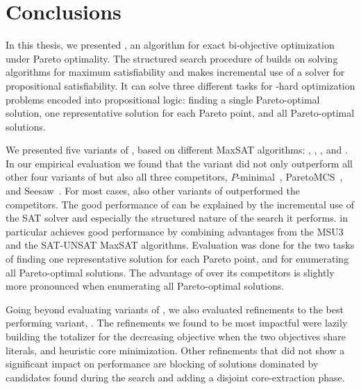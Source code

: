 \chapter{Conclusions\label{chap:conclusion}}

In this thesis, we presented \algname{}, an algorithm for exact bi-objective optimization under Pareto optimality.
The structured search procedure of \algname{} builds on solving algorithms for maximum satisfiability and makes incremental use of a solver for propositional satisfiability.
It can solve three different tasks for \NP-hard optimization problems encoded into propositional logic:
finding a single Pareto-optimal solution, one representative solution for each Pareto point, and all Pareto-optimal solutions.

We presented five variants of \algname{}, based on different MaxSAT algorithms: \satunsat{}, \unsatsat{}, \msu{}, \oll{} and \msh{}.
In our empirical evaluation we found that the \msh{} variant did not only outperform all other four variants of \algname{} but also all three competitors, $P$-minimal~\autocite{DBLP:conf/cp/SohBTB17}, ParetoMCS~\autocite{DBLP:conf/ijcai/Terra-NevesLM18a}, and Seesaw~\autocite{DBLP:conf/cp/JanotaMSM21}.
For most cases, also other variants of \algname{} outperformed the competitors.
The good performance of \algname{} can be explained by the incremental use of the SAT solver and especially the structured nature of the search it performs.
\msh{} in particular achieves good performance by combining advantages from the MSU3 and the SAT-UNSAT MaxSAT algorithms.
Evaluation was done for the two tasks of finding one representative solution for each Pareto point, and for enumerating all Pareto-optimal solutions.
The advantage of \algname{} over its competitors is slightly more pronounced when enumerating all Pareto-optimal solutions.

Going beyond evaluating variants of \algname{}, we also evaluated refinements to the best performing variant, \msh{}.
The refinements we found to be most impactful were lazily building the totalizer for the decreasing objective when the two objectives share literals, and heuristic core minimization.
Other refinements that did not show a significant impact on performance are blocking of solutions dominated by candidates found during the search and adding a disjoint core-extraction phase.

